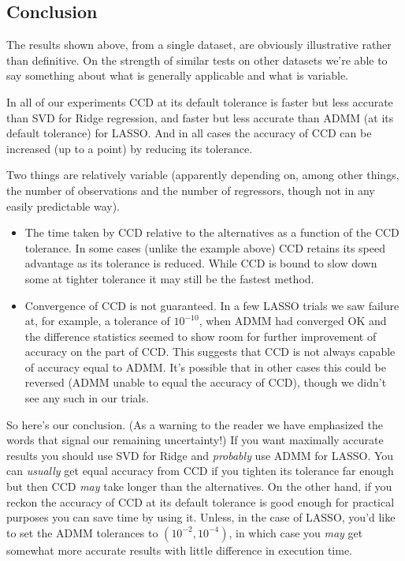 \documentclass{article}
\begin{document}
\subsection*{Conclusion}

The results shown above, from a single dataset, are obviously
illustrative rather than definitive. On the strength of similar tests
on other datasets we're able to say something about what is generally
applicable and what is variable.

In all of our experiments CCD at its default tolerance is faster but
less accurate than SVD for Ridge regression, and faster but less
accurate than ADMM (at its default tolerance) for LASSO. And in all
cases the accuracy of CCD can be increased (up to a point) by
reducing its tolerance.

Two things are relatively variable (apparently depending on, among other
things, the number of observations and the number of regressors,
though not in any easily predictable way).
\begin{itemize}
\item The time taken by CCD relative to the alternatives as a function
  of the CCD tolerance. In some cases (unlike the example above) CCD
  retains its speed advantage as its tolerance is reduced. While CCD
  is bound to slow down some at tighter tolerance it may still be the
  fastest method.
\item Convergence of CCD is not guaranteed. In a few LASSO trials we
  saw failure at, for example, a tolerance of $10^{-10}$, when ADMM
  had converged OK and the difference statistics seemed to show room
  for further improvement of accuracy on the part of CCD. This
  suggests that CCD is not always capable of accuracy equal to
  ADMM. It's possible that in other cases this could be reversed (ADMM
  unable to equal the accuracy of CCD), though we didn't see any such
  in our trials.
\end{itemize}

So here's our conclusion. (As a warning to the reader we have
emphasized the words that signal our remaining uncertainty!)  If you
want maximally accurate results you should use SVD for Ridge and
\textit{probably} use ADMM for LASSO. You can \textit{usually} get
equal accuracy from CCD if you tighten its tolerance far enough but
then CCD \textit{may} take longer than the alternatives. On the other
hand, if you reckon the accuracy of CCD at its default tolerance is
good enough for practical purposes you can save time by using it.
Unless, in the case of LASSO, you'd like to set the ADMM tolerances to
$(10^{-2}, 10^{-4})$, in which case you \textit{may} get somewhat more
accurate results with little difference in execution time.
\end{document}
